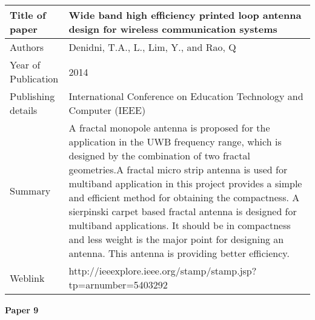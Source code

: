 \documentclass[12pt]{article}
\begin{document}
		  \begin{center}
		  	\begin{table}[H]
		  		\centering
		  		\begin{tabular}{ |l|p{11cm}| }
		  			\hline
		  			Title of paper &  Wide band high efficiency printed loop antenna design for wireless communication systems  \\
		  			\hline
		  			Authors & Denidni, T.A., L., Lim, Y., and Rao, Q \\
		  			\hline
		  			Year of Publication & 2014 \\
		  			\hline
		  			Publishing details & International Conference on Education Technology and Computer (IEEE) \\ \hline
		  			Summary & A fractal monopole antenna is proposed for the application in the UWB frequency range, which is designed by the combination of two fractal geometries.A fractal micro strip antenna is used for multiband application in this project provides a simple and efficient method for obtaining the compactness. A sierpinski carpet based fractal antenna is designed for multiband applications. It should be in compactness and less weight is the major point for designing an antenna. This antenna is providing better efficiency.\\
		  			\hline
		  			Weblink & http://ieeexplore.ieee.org/stamp/stamp.jsp?tp=arnumber=5403292 \\
		  			\hline			 
		  		\end{tabular}		
		  		
		  	\end{table}
		  \end{center}
		
		\cleardoublepage
		
			\begin{flushleft}
				\textbf{Paper 9}
			\end{flushleft}
			
\end{document}
